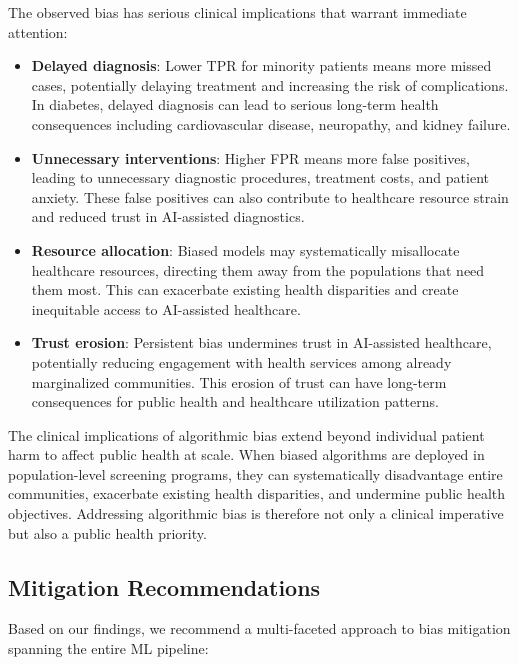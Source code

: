 The observed bias has serious clinical implications that warrant immediate 
attention:

\begin{itemize}[leftmargin=*]
    \item \textbf{Delayed diagnosis}: Lower TPR for minority patients means 
          more missed cases, potentially delaying treatment and increasing 
          the risk of complications. In diabetes, delayed diagnosis can lead 
          to serious long-term health consequences including cardiovascular 
          disease, neuropathy, and kidney failure.
    \item \textbf{Unnecessary interventions}: Higher FPR means more false 
          positives, leading to unnecessary diagnostic procedures, treatment 
          costs, and patient anxiety. These false positives can also contribute 
          to healthcare resource strain and reduced trust in AI-assisted 
          diagnostics.
    \item \textbf{Resource allocation}: Biased models may systematically 
          misallocate healthcare resources, directing them away from the 
          populations that need them most. This can exacerbate existing 
          health disparities and create inequitable access to AI-assisted 
          healthcare.
    \item \textbf{Trust erosion}: Persistent bias undermines trust in 
          AI-assisted healthcare, potentially reducing engagement with 
          health services among already marginalized communities. This 
          erosion of trust can have long-term consequences for public 
          health and healthcare utilization patterns.
\end{itemize}

The clinical implications of algorithmic bias extend beyond individual 
patient harm to affect public health at scale. When biased algorithms 
are deployed in population-level screening programs, they can systematically 
disadvantage entire communities, exacerbate existing health disparities, 
and undermine public health objectives. Addressing algorithmic bias is 
therefore not only a clinical imperative but also a public health priority.

\subsection{Mitigation Recommendations}

Based on our findings, we recommend a multi-faceted approach to bias 
mitigation spanning the entire ML pipeline:

